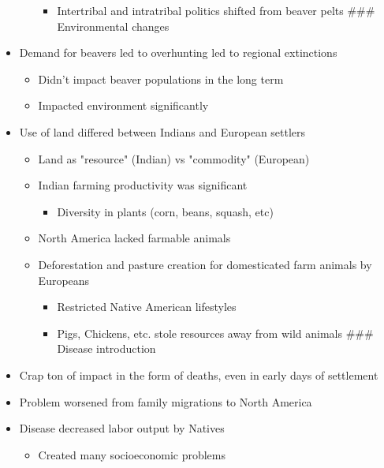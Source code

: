 \documentclass[letterpaper]{article}
\begin{document}
\begin{itemize}
\begin{itemize}
\begin{itemize}
\item Intertribal and intratribal politics shifted from beaver pelts \#\#\#
Environmental changes
\end{itemize}
\end{itemize}

\item Demand for beavers led to overhunting led to regional extinctions

\begin{itemize}
\item Didn't impact beaver populations in the long term
\item Impacted environment significantly
\end{itemize}

\item Use of land differed between Indians and European settlers

\begin{itemize}
\item Land as "resource" (Indian) vs "commodity" (European)
\item Indian farming productivity was significant

\begin{itemize}
\item Diversity in plants (corn, beans, squash, etc)
\end{itemize}

\item North America lacked farmable animals
\item Deforestation and pasture creation for domesticated farm animals by
Europeans

\begin{itemize}
\item Restricted Native American lifestyles
\item Pigs, Chickens, etc. stole resources away from wild animals \#\#\#
Disease introduction
\end{itemize}
\end{itemize}

\item Crap ton of impact in the form of deaths, even in early days of
settlement
\item Problem worsened from family migrations to North America
\item Disease decreased labor output by Natives

\begin{itemize}
\item Created many socioeconomic problems
\end{itemize}
\end{itemize}
\end{document}
